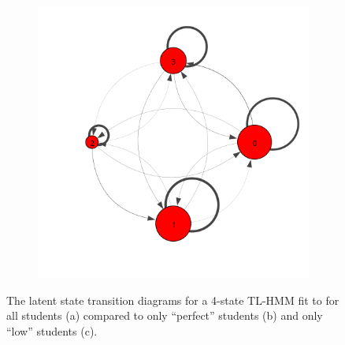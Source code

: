 \begin{figure}
\begin{subfigure}[t]{0.33\textwidth}
    \caption{\label{fig:trans-perfect}}
  \end{subfigure}%
  \begin{subfigure}[t]{0.33\textwidth}
    \includegraphics[width=\textwidth,trim={0, 3cm 0 2cm}]{figures/trans-comp/trans-low.png}
    \caption{\label{fig:trans-low}}
  \end{subfigure}
  \caption{The latent state transition diagrams for a 4-state TL-HMM fit to
  \protect\textretrieval{} for all students (a) compared to only ``perfect''
  students (b) and only ``low'' students (c).}
  \label{fig:trans-comp}
\end{figure}

